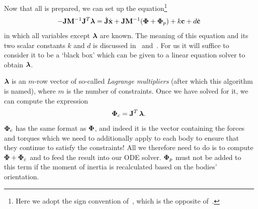 Now that all is prepared, we can set up the equation\footnote{Here we adopt the sign convention
of~\cite{BaraffWitkin:97}, which is the opposite of~\cite{Saunders:PhD}.}
\begin{equation}
\label{lagrangeEquation}
-\m{J}\m{M}^{-1}\m{J}^T\ve{\lambda} = \dot{\m{J}}\dot{\ve{x}} +
    \m{J}\m{M}^{-1}(\ve{\Phi} + \ve{\Phi}_p) + k\ve{c} + d\dot{\ve{c}}
\end{equation}
in which all variables except $\ve{\lambda}$ are known. The meaning of this equation and
its two scalar constants $k$ and $d$ is discussed in~\cite{BaraffWitkin:97}
and~\cite{Saunders:PhD}. For us it will suffice to consider it to be a `black box' which can be
given to a linear equation solver to obtain $\ve{\lambda}$.

$\ve{\lambda}$ is an $m$-row vector of so-called \emph{Lagrange multipliers} (after which this
algorithm is named), where $m$ is the number of constraints. Once we have solved for it, we can
compute the expression
\begin{equation}
\ve{\Phi}_c = \m{J}^T\,\ve{\lambda}.
\end{equation}
$\ve{\Phi}_c$ has the same format as $\ve{\Phi}$, and indeed it is the vector containing
the forces and torques which we need to additionally apply to each body to ensure that they
continue to satisfy the constraints! All we therefore need to do is to compute
$\ve{\Phi} + \ve{\Phi}_c$ and to feed the result into our ODE solver. $\ve{\Phi}_p$ must not
be added to this term if the moment of inertia is recalculated based on the bodies' orientation.
